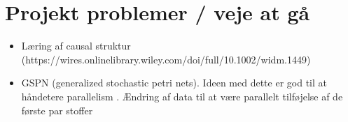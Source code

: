 \documentclass[../Thesis.tex]{subfiles}
\begin{document}
\chapter{Projekt problemer / veje at gå}

\begin{itemize}
    \item Læring af causal struktur (https://wires.onlinelibrary.wiley.com/doi/full/10.1002/widm.1449)
    \item GSPN (generalized stochastic petri nets). Ideen med dette er god til at håndetere parallelism \cite{Balbo2007}. Ændring af data til at være parallelt tilføjelse af de første par stoffer
\end{itemize}
\end{document}
